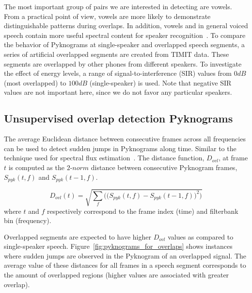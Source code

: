 {The most important group of pairs we are interested in detecting are vowels. 
From a practical point of view, vowels are more likely to demonstrate distinguishable patterns during overlaps. 
In addition, vowels and in general voiced speech contain more useful spectral content for speaker recognition~\cite{early_speakerid_paper}. 
To compare the behavior of Pyknograms at single-speaker and overlapped speech segments, a series of artificial overlapped segments are created from TIMIT data. 
These segments are overlapped by other phones from different speakers. 
To investigate the effect of energy levels, a range of signal-to-interference (SIR) values from $0dB$ (most overlapped) to $100dB$ (single-speaker) is used. 
Note that negative SIR values are not important here, since we do not favor any particular speakers. 

\subsection{Unsupervised overlap detection Pyknograms}

The average Euclidean distance between consecutive frames across all frequencies can be used to detect sudden jumps in Pyknograms along time. 
Similar to the technique used for spectral flux estimation~\cite{Rossignol_spectralflux}. 
The distance function, $D_{ovl}$, at frame $t$ is computed as the $2$-$norm$ distance between consecutive Pyknogram frames, $S_{pyk}(t,f)$ and $S_{pyk}(t-1,f)$. 

\begin{equation}
\label{eq:ovl_det_score}
D_{ovl}(t) = \sqrt{\sum_f\Big(\big(S_{pyk}(t,f)-S_{pyk}(t-1,f)\big)^2\Big)}
\end{equation}
where $t$ and $f$ respectively correspond to the frame index (time) and filterbank bin (frequency). 

Overlapped segments are expected to have higher $D_{ovl}$ values as compared to single-speaker speech. 
Figure~\ref{fig:pyknograms_for_overlaps} shows instances where sudden jumps are observed in the Pyknogram of an overlapped signal. 
The average value of these distances for all frames in a speech segment corresponds to the amount of overlapped regions (higher values are associated with greater overlap). 

}

